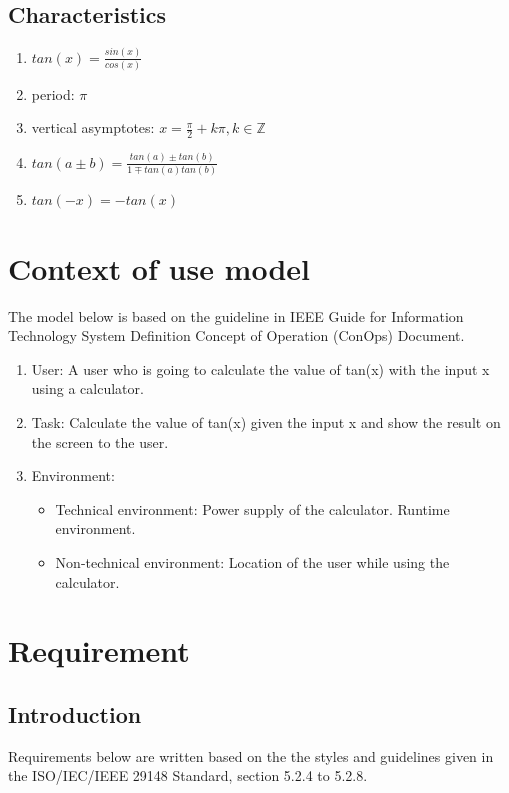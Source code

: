 \documentclass{article}
\begin{document}
\subsection{Characteristics}
\begin{enumerate}
    \item $tan(x)=\frac{sin(x)}{cos(x)}$
    \item period: $\pi$
    \item vertical asymptotes: $x=\frac{\pi}{2}+k\pi, k\in\mathbb{Z}$
    \item $tan(a\pm b)=\frac{tan(a)\pm tan(b)}{1\mp tan(a)tan(b)}$
    \item $tan(-x)=-tan(x)$
\end{enumerate}

\section{Context of use model}
The model below is based on the guideline in IEEE Guide for Information Technology System Definition Concept of Operation (ConOps) Document.\cite{1998ieee}
\begin{enumerate}
    \item User: A user who is going to calculate the value of tan(x) with the input x using a calculator.
    \item Task: Calculate the value of tan(x) given the input x and show the result on the screen to the user.
    \item Environment:
    \begin{itemize}
        \item Technical environment: Power supply of the calculator. Runtime environment.
        \item Non-technical environment: Location of the user while using the calculator.
    \end{itemize}
\end{enumerate}


\newpage
{}
\section{Requirement}

\subsection{Introduction}
Requirements below are written based on the the styles and guidelines given in the ISO/IEC/IEEE 29148 Standard, section 5.2.4 to 5.2.8.\cite{8559686}
\end{document}
